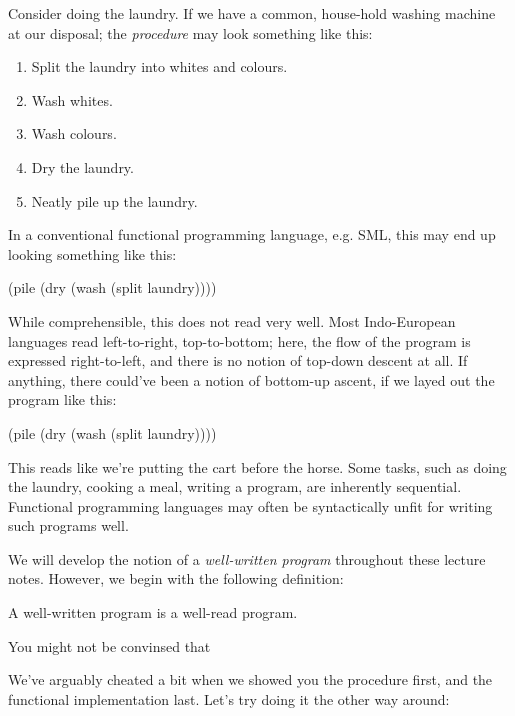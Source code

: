 Consider doing the laundry. If we have a common, house-hold washing machine at
our disposal; the {\it procedure} may look something like this:

\begin{enumerate}

\item Split the laundry into whites and colours.

\item Wash whites.

\item Wash colours.

\item Dry the laundry.

\item Neatly pile up the laundry.

\end{enumerate}

In a conventional functional programming language, e.g. SML, this may end up
looking something like this:

\begin{code}
(pile (dry (wash (split laundry))))
\end{code}

While comprehensible, this does not read very well. Most Indo-European
languages read left-to-right, top-to-bottom; here, the flow of the program is
expressed right-to-left, and there is no notion of top-down descent at all. If
anything, there could've been a notion of bottom-up ascent, if we layed out the
program like this:

\begin{code}
(pile
  (dry
    (wash
      (split laundry))))
\end{code}

This reads like we're putting the cart before the horse. Some tasks, such as
doing the laundry, cooking a meal, writing a program, are inherently
sequential. Functional programming languages may often be syntactically unfit
for writing such programs well.

We will develop the notion of a {\it well-written program} throughout these
lecture notes. However, we begin with the following definition:

\begin{definition}
A well-written program is a well-read program.
\end{definition}

You might not be convinsed that 

We've arguably cheated a bit when we showed you the procedure first, and the
functional implementation last. Let's try doing it the other way around:
